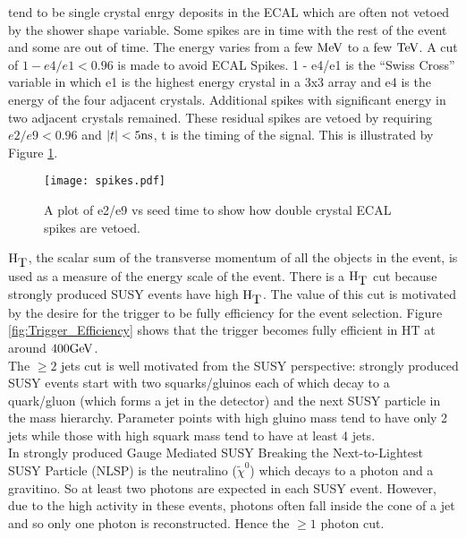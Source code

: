 \begin{itemize}
tend to be single crystal enrgy deposits in the ECAL which are often not vetoed 
by the shower shape variable. Some spikes are in time with the rest of the event 
and some are out of time. The energy varies from a few $\mbox{MeV}$ to a few $\mbox{TeV}$. A 
cut of $1 - e4/e1 < 0.96$ is made to avoid ECAL Spikes. 1 - e4/e1 is the ``Swiss 
Cross'' variable in which e1 is the highest energy crystal in a 3x3 array and e4 
is the energy of the four adjacent crystals. Additional spikes with significant
energy in two adjacent crystals remained. These residual spikes are vetoed by
requiring $e2/e9 < 0.96$ and $|t| < 5\mbox{ns}$, t is the timing of the signal. This 
is illustrated by Figure \ref{fig:spikes}.
\end{itemize}

\begin{figure}
\begin{center}
\texttt{[image: spikes.pdf]}
\end{center}
\caption{A plot of e2/e9 vs seed time to show how double crystal ECAL spikes are
vetoed.}
\label{fig:spikes}
\end{figure}

$\mbox{H}_{\mbox{T}}$, the scalar sum of the transverse momentum of all the objects in the 
event, is used as a measure of the energy scale of the event. There is a $\mbox{H}_{\mbox{T}}$ 
cut because strongly produced SUSY events have high $\mbox{H}_{\mbox{T}}$. The value of this cut
is motivated by the desire for the trigger to be fully efficiency for the event
selection. Figure \ref{fig:Trigger_Efficiency} shows that the trigger becomes
fully efficient in HT at around $400\mbox{GeV}$. \\

The $\geq 2$ jets cut is well motivated from the SUSY perspective: strongly
produced SUSY events start with two squarks/gluinos each of which decay to a 
quark/gluon (which forms a jet in the detector) and the next SUSY particle in 
the mass hierarchy. Parameter points with high gluino mass tend to have only 2 
jets while those with high squark mass tend to have at least 4 jets. \\

In strongly produced Gauge Mediated SUSY Breaking the Next-to-Lightest SUSY 
Particle (NLSP) is the neutralino ($\tilde{\chi}^{0}$) which decays to a photon and 
a gravitino. So at least two photons are expected in each SUSY event. However, 
due to the high activity in these events, photons often fall inside the cone of
a jet and so only one photon is reconstructed. Hence the $\geq 1$ photon cut. \\

